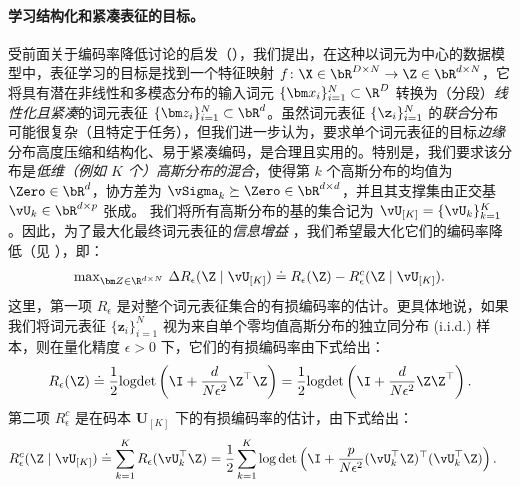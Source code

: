 \documentclass[../../book-main_zh.tex]{subfiles}
\begin{document}
\paragraph{学习结构化和紧凑表征的目标。}
受前面关于编码率降低讨论的启发（），我们提出，在这种以词元为中心的数据模型中，表征学习的目标是找到一个特征映射 \(f \colon \X \in \bR^{D \times N} \to \Z\in \bR^{d \times N}\)，它将具有潜在非线性和多模态分布的输入词元 \(\{\bm x_i\}_{i=1}^N \subset \R^D\) 转换为（分段）\textit{线性化且紧凑}的词元表征 \(\{\bm z_i\}_{i=1}^N \subset \bR^{d}\)。虽然词元表征 \(\{\z_{i}\}_{i = 1}^{N}\) 的{\em 联合}分布可能很复杂（且特定于任务），但我们进一步认为，要求单个词元表征的目标{\em 边缘}分布高度压缩和结构化、易于紧凑编码，是合理且实用的。特别是，我们要求该分布是\textit{低维（例如 \(K\) 个）高斯分布的混合}，使得第 \(k\) 个高斯分布的均值为 \(\Zero \in \bR^{d}\)，协方差为 \(\vSigma_{k} \succeq \Zero \in \bR^{d \times d}\)，并且其支撑集由正交基 \(\vU_{k} \in \bR^{d \times p}\) 张成。
我们将所有高斯分布的基的集合记为 $\vU_{[K]} = \{\vU_k\}_{k=1}^K$。因此，为了最大化最终词元表征的\textit{信息增益} \cite{ma2022principles}，我们希望最大化它们的编码率降低（见 ），即：
\begin{align}\label{eq:rate reduction}
    \mathrm{max}_{\bm Z \in \R^{d\times N}}\ \Delta R_{\epsilon}(\Z
    \mid \vU_{[K]}) \doteq R_{\epsilon}(\Z) - R^c_{\epsilon}(\Z \mid \vU_{[K]}).
\end{align}
这里，第一项 $R_{\epsilon}$ 是对整个词元表征集合的有损编码率的估计。更具体地说，如果我们将词元表征 $\{\bm z_i\}_{i=1}^N$ 视为来自单个零均值高斯分布的独立同分布 (i.i.d.) 样本，则在量化精度 $\epsilon > 0$ 下，它们的有损编码率由下式给出：
\begin{equation}\label{eq:coding_rate}
    R_{\epsilon}(\Z) \doteq \frac{1}{2}\textrm{logdet}\left(\I +
    \frac{d}{N\epsilon^{2}}\Z^{\top}\Z\right) =
    \frac{1}{2}\textrm{logdet}\left(\I +
    \frac{d}{N\epsilon^{2}}\Z\Z^{\top}\right).
\end{equation}
第二项 $R_{\epsilon}^c$ 是在码本 $\bm U_{[K]}$ 下的有损编码率的估计，由下式给出：
\begin{equation}
    \begin{aligned}
        R_{\epsilon}^c(\Z \mid \vU_{[K]}) &\doteq
        \sum_{k=1}^{K}R_{\epsilon}(\vU_k^{\top} \Z) =
        \frac{1}{2}\sum_{k=1}^{K}\log\det\left(\I +
        \frac{p}{N\epsilon^{2}}(\vU_k^{\top}\Z)^{\top}(\vU_k^{\top}\Z)\right).
    \end{aligned}
    \label{eq:def-mcr-Rc}
\end{equation}
\end{document}
